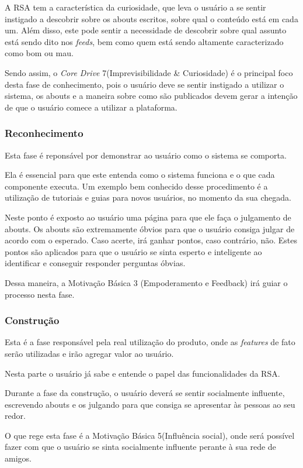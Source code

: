 A RSA tem a característica da curiosidade, que leva o usuário a se sentir instigado
a descobrir sobre os abouts escritos, sobre qual o conteúdo está  em cada
um. Além disso, este pode sentir a necessidade de descobrir sobre qual assunto está
sendo dito nos \textit{feeds}, bem como quem está sendo altamente caracterizado como bom ou mau.

Sendo assim, o \textit{Core Drive} 7(Imprevisibilidade \& Curiosidade) é o principal foco desta fase
de conhecimento, pois o usuário deve se sentir instigado a utilizar o sistema, os abouts
e a maneira sobre como são publicados  devem gerar a intenção de que o usuário comece a utilizar
a plataforma.


\subsubsection{Reconhecimento}
\label{sub:reconhecimento}
Esta fase é reponsável por demonstrar ao usuário como o sistema se comporta.

Ela é essencial para que este entenda como o sistema funciona e o que cada
componente executa. Um exemplo bem conhecido desse procedimento é a utilização
de tutoriais e guias para novos usuários, no momento da sua chegada.

Neste ponto é exposto ao usuário uma página para que ele faça o julgamento de 
abouts.
Os abouts são extremamente óbvios para que o usuário consiga julgar de acordo 
com o
esperado. Caso acerte, irá ganhar pontos, caso contrário, não. Estes pontos
são aplicados para que o usuário se sinta esperto e inteligente ao 
identificar e conseguir responder perguntas óbvias.

Dessa maneira, a Motivação Básica 3 (Empoderamento e Feedback) irá guiar o
processo nesta fase.

\subsubsection{Construção}
\label{sub:constru_o}
Esta é a fase responsável pela real utilização do produto, onde as \textit{features}
de fato serão utilizadas e irão agregar valor ao usuário.

Nesta parte o usuário já sabe e entende o papel das funcionalidades da RSA.

Durante a fase da construção, o usuário deverá se sentir socialmente influente,
escrevendo abouts e os julgando para que consiga se apresentar às pessoas ao seu redor.

O que rege esta fase é a Motivação Básica 5(Influência social), onde será possível
fazer com que o usuário se sinta socialmente influente perante à sua rede de amigos.

